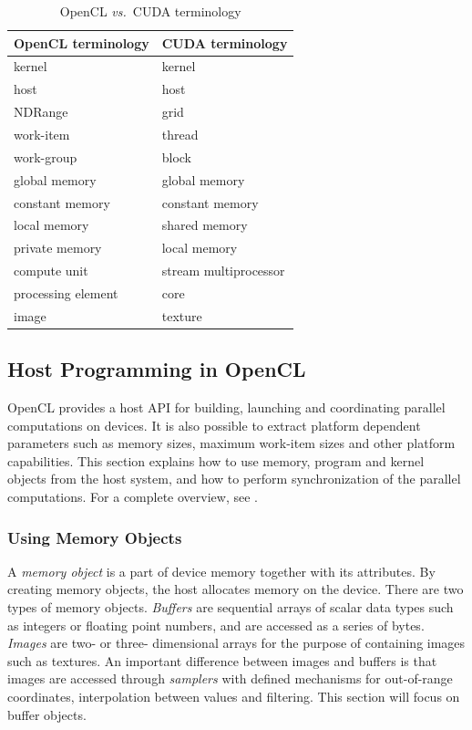 	\begin{table}[h]
	\centering
	\small
	\begin{tabular}{| l l |}
		\hline
		\textbf{OpenCL terminology} & \textbf{CUDA terminology} \\
		\hline
		\hline
		kernel & kernel \\
		host & host \\
		NDRange & grid \\
		work-item & thread \\
		work-group & block \\
		global memory & global memory \\
		constant memory & constant memory \\
		local memory & shared memory \\
		private memory & local memory \\
		compute unit & stream multiprocessor \\
		processing element & core \\
		image & texture \\
		\hline
	\end{tabular}
	\caption{OpenCL \textit{vs.}\ CUDA terminology}
	\label{table:opencl_vs_cuda}
	\end{table}

\subsection{Host Programming in OpenCL}

	OpenCL provides a host API for building, launching and coordinating parallel computations on devices. It is also possible to extract platform dependent parameters such as memory sizes, maximum work-item sizes and other platform capabilities. This section explains how to use memory, program and kernel objects from the host system, and how to perform synchronization of the parallel computations. For a complete overview, see \cite{openclspec}.

	\subsubsection{Using Memory Objects}
	
		A \emph{memory object} is a part of device memory together with its attributes. By creating memory objects, the host allocates memory on the device. There are two types of memory objects. \emph{Buffers} are sequential arrays of scalar data types such as integers or floating point numbers, and are accessed as a series of bytes. \emph{Images} are two- or three- dimensional arrays for the purpose of containing images such as textures. An important difference between images and buffers is that images are accessed through \emph{samplers} with defined mechanisms for out-of-range coordinates, interpolation between values and filtering. This section will focus on buffer objects.
		
